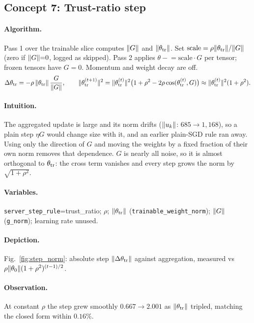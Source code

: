 \subsection{Concept 7: Trust-ratio step}
\paragraph{Algorithm.}
Pass 1 over the trainable slice computes $\lVert G\rVert$ and $\lVert \theta_{\mathrm{tr}}\rVert$. Set $\text{scale}=\rho\lVert \theta_{\mathrm{tr}}\rVert/\lVert G\rVert$ (zero if $\lVert G\rVert{=}0$, logged as skipped). Pass 2 applies $\theta\mathrel{-}=\text{scale}\cdot G$ per tensor; frozen tensors have $G=0$. Momentum and weight decay are off.
\begin{equation}
\Delta\theta_{\mathrm{tr}}=-\rho\,\lVert \theta_{\mathrm{tr}}\rVert\,\frac{G}{\lVert G\rVert},\qquad
\lVert \theta_{\mathrm{tr}}^{(t+1)}\rVert^2=\lVert \theta_{\mathrm{tr}}^{(t)}\rVert^2\bigl(1+\rho^2-2\rho\cos(\theta_{\mathrm{tr}}^{(t)},G)\bigr)\approx\lVert \theta_{\mathrm{tr}}^{(t)}\rVert^2(1+\rho^2).
\end{equation}
\paragraph{Intuition.}
The aggregated update is large and its norm drifts ($\lVert u_k\rVert$: $685\to1{,}168$), so a plain step $\eta G$ would change size with it, and an earlier plain-SGD rule ran away.
Using only the direction of $G$ and moving the weights by a fixed fraction of their own norm removes that dependence. $G$ is nearly all noise, so it is almost orthogonal to $\theta_{\mathrm{tr}}$:
the cross term vanishes and every step grows the norm by $\sqrt{1+\rho^2}$.
\paragraph{Variables.}
\texttt{server\_step\_rule}=trust\_ratio; $\rho$; $\lVert \theta_{\mathrm{tr}}\rVert$ (\texttt{trainable\_weight\_norm}); $\lVert G\rVert$ (\texttt{g\_norm}); learning rate unused.
\paragraph{Depiction.} Fig.~\ref{fig:step_norm}: absolute step $\lVert \Delta\theta_{\mathrm{tr}}\rVert$ against aggregation, measured vs $\rho\lVert \theta_0\rVert(1+\rho^2)^{(t-1)/2}$.
\paragraph{Observation.}
At constant $\rho$ the step grew smoothly $0.667\to2.001$ as $\lVert \theta_{\mathrm{tr}}\rVert$ tripled, matching the closed form within $0.16\%$.

